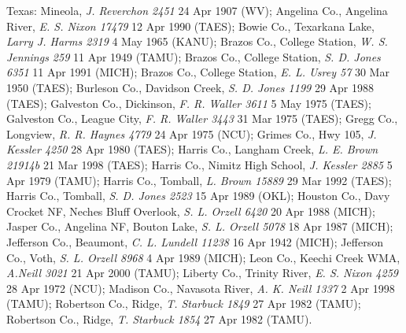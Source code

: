 \documentclass{article}
\begin{document}
Texas:
Mineola, \textit{J. Reverchon 2451} 24 Apr 1907 (WV);
Angelina Co., Angelina River, \textit{E. S. Nixon 17479} 12 Apr 1990 (TAES);
Bowie Co., Texarkana Lake, \textit{Larry J. Harms 2319} 4 May 1965 (KANU);
Brazos Co., College Station, \textit{W. S. Jennings 259} 11 Apr 1949 (TAMU);
Brazos Co., College Station, \textit{S. D. Jones 6351} 11 Apr 1991 (MICH);
Brazos Co., College Station, \textit{E. L. Usrey 57} 30 Mar 1950 (TAES);
Burleson Co., Davidson Creek, \textit{S. D. Jones 1199} 29 Apr 1988 (TAES);
Galveston Co., Dickinson, \textit{F. R. Waller 3611} 5 May 1975 (TAES);
Galveston Co., League City, \textit{F. R. Waller 3443} 31 Mar 1975 (TAES);
Gregg Co., Longview, \textit{R. R. Haynes 4779} 24 Apr 1975 (NCU);
Grimes Co., Hwy 105, \textit{J. Kessler 4250} 28 Apr 1980 (TAES);
Harris Co., Langham Creek, \textit{L. E. Brown 21914b} 21 Mar 1998 (TAES);
Harris Co., Nimitz High School, \textit{J. Kessler 2885} 5 Apr 1979 (TAMU);
Harris Co., Tomball, \textit{L. Brown 15889} 29 Mar 1992 (TAES);
Harris Co., Tomball, \textit{S. D. Jones 2523} 15 Apr 1989 (OKL);
Houston Co., Davy Crocket NF, Neches Bluff Overlook, \textit{S. L. Orzell 6420} 20 Apr 1988 (MICH);
Jasper Co., Angelina NF, Bouton Lake, \textit{S. L. Orzell 5078} 18 Apr 1987 (MICH);
Jefferson Co., Beaumont, \textit{C. L. Lundell 11238} 16 Apr 1942 (MICH);
Jefferson Co., Voth, \textit{S. L. Orzell 8968} 4 Apr 1989 (MICH);
Leon Co., Keechi Creek WMA, \textit{A.Neill 3021} 21 Apr 2000 (TAMU);
Liberty Co., Trinity River, \textit{E. S. Nixon 4259} 28 Apr 1972 (NCU);
Madison Co., Navasota River, \textit{A. K. Neill 1337} 2 Apr 1998 (TAMU);
Robertson Co., Ridge, \textit{T. Starbuck 1849} 27 Apr 1982 (TAMU);
Robertson Co., Ridge, \textit{T. Starbuck 1854} 27 Apr 1982 (TAMU).
\end{document}
